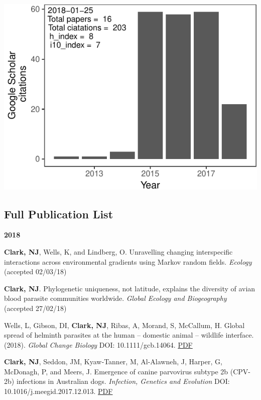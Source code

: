 \documentclass[]{article}
\begin{document}
\begin{center}\includegraphics{NicholasClarkCV_files/figure-latex/unnamed-chunk-1-1} \end{center}

\pagebreak

\subsection{Full Publication List}\label{full-publication-list}

\textbf{2018}

\textbf{Clark, NJ}, Wells, K, and Lindberg, O. Unravelling changing
interspecific interactions across environmental gradients using Markov
random fields. \emph{Ecology} (accepted 02/03/18)

\textbf{Clark, NJ}. Phylogenetic uniqueness, not latitude, explains the
diversity of avian blood parasite communities worldwide. \emph{Global
Ecology and Biogeography} (accepted 27/02/18)

Wells, L, Gibson, DI, \textbf{Clark, NJ}, Ribas, A, Morand, S, McCallum,
H. Global spread of helminth parasites at the human -- domestic animal
-- wildlife interface. (2018). \emph{Global Change Biology} DOI:
10.1111/gcb.14064.
\href{http://nicholasjclark.weebly.com/uploads/4/4/9/4/44946407/wells_etal_2018_globchangbiol.pdf}{PDF}

\textbf{Clark, NJ}, Seddon, JM, Kyaw‐Tanner, M, Al-Alawneh, J, Harper,
G, McDonagh, P, and Meers, J. Emergence of canine parvovirus subtype 2b
(CPV-2b) infections in Australian dogs. \emph{Infection, Genetics and
Evolution} DOI: 10.1016/j.meegid.2017.12.013.
\href{http://nicholasjclark.weebly.com/uploads/4/4/9/4/44946407/clark_infgenevol_2018.pdf}{PDF}
\end{document}
